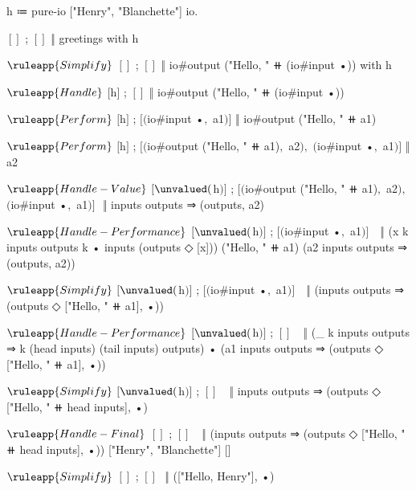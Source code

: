 \begin{snippet}[caption={Handle greetings with pure \IO}]
h ≔ pure-io ["Henry", "Blanchette"] io.

$[]$ ; $[]$ ‖ greetings with h

$\ruleapp{Simplify}$
$[]$ ; $[]$ ‖ io#output ("Hello, " ⧺ (io#input •)) with h

$\ruleapp{Handle}$
$[$h$]$ ; $[]$ ‖ io#output ("Hello, " ⧺ (io#input •))

$\ruleapp{Perform}$
$[$h$]$ ; $[$$($io#input •$,$ a1$)$$]$ ‖ io#output ("Hello, " ⧺ a1)

$\ruleapp{Perform}$
$[$h$]$ ; $[$$($io#output ("Hello, " ⧺ a1)$,$ a2$)$$,$ $($io#input •$,$ a1$)$$]$ ‖ a2

$\ruleapp{Handle-Value}$
$[\unvalued($h$)]$ ; $[$$($io#output ("Hello, " ⧺ a1)$,$ a2$)$$,$ $($io#input •$,$ a1$)$$]$ $ $
  $ $‖ inputs outputs ⇒ (outputs, a2)

$\ruleapp{Handle-Performance}$
$[\unvalued($h$)]$ ; $[$$($io#input •$,$ a1$)$$]$ $ $
  $ $ ‖ (x k inputs outputs k • inputs (outputs ◇ [x]))
      ("Hello, " ⧺ a1)
      (a2 inputs outputs ⇒ (outputs, a2))

$\ruleapp{Simplify}$
$[\unvalued($h$)]$ ; $[$$($io#input •$,$ a1$)$$]$ $ $
  $ $ ‖ (inputs outputs ⇒ (outputs ◇ ["Hello, " ⧺ a1], •))

$\ruleapp{Handle-Performance}$
$[\unvalued($h$)]$ ; $[]$ $ $
  $ $ ‖ (_ k inputs outputs ⇒ k (head inputs) (tail inputs) outputs)
        •
        (a1 inputs outputs ⇒ (outputs ◇ ["Hello, " ⧺ a1], •))

$\ruleapp{Simplify}$
$[\unvalued($h$)]$ ; $[]$ $ $
  $ $ ‖ inputs outputs ⇒ (outputs ◇ ["Hello, " ⧺ head inputs], •)

$\ruleapp{Handle-Final}$
$[]$ ; $[]$ $ $
  $ $ ‖ (inputs outputs ⇒ (outputs ◇ ["Hello, " ⧺ head inputs], •))
      ["Henry", "Blanchette"]
      []

$\ruleapp{Simplify}$
$[]$ ; $[]$ $ $
  $ $‖ (["Hello, Henry"], •)

\end{snippet}
